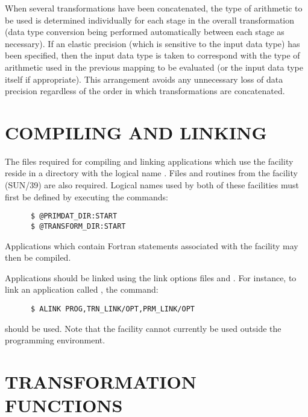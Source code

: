 When several transformations have been concatenated, the type of arithmetic
to be used is determined individually for each stage in the overall
transformation (data type conversion being performed automatically between
each stage as necessary). 
If an elastic precision (which is sensitive to the input data type) has been
specified, then the input data type is taken to correspond with the type of
arithmetic used in the previous mapping to be evaluated (or the input data
type itself if appropriate).
This arrangement avoids any unnecessary loss of data precision regardless of
the order in which transformations are concatenated. 


\section{COMPILING AND LINKING}

The files required for compiling and linking applications which use the
 facility reside in a directory with the logical name
. 
Files and routines from the  facility (SUN/39) are also
required. 
Logical names used by both of these facilities must first be defined by
executing the  commands: 

\begin{verbatim}
      $ @PRIMDAT_DIR:START
      $ @TRANSFORM_DIR:START
\end{verbatim}

Applications which contain Fortran  statements associated with 
the  facility may then be compiled. 

Applications should be linked using the link options files 
and . 
For instance, to link an application called , the 
command: 

\begin{verbatim}
      $ ALINK PROG,TRN_LINK/OPT,PRM_LINK/OPT
\end{verbatim}

should be used.
Note that the  facility cannot currently be used outside the
 programming environment. 


\appendix


\newpage
\section{TRANSFORMATION FUNCTIONS}

\label{appendix:syntax}

